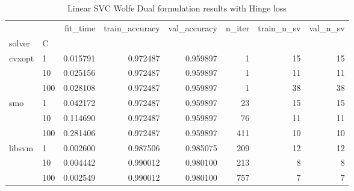 \begin{table}[h!]
\centering
\caption{Linear SVC Wolfe Dual formulation results with Hinge loss}
\label{linear_dual_svc_cv_results}
\begin{tabular}{llrrrrrr}
\toprule
       &     &  fit\_time &  train\_accuracy &  val\_accuracy &  n\_iter &  train\_n\_sv &  val\_n\_sv \\
solver & C &           &                 &               &         &             &           \\
\midrule
cvxopt & 1   &  0.015791 &        0.972487 &      0.959897 &       1 &          15 &        15 \\
       & 10  &  0.025156 &        0.972487 &      0.959897 &       1 &          11 &        11 \\
       & 100 &  0.028108 &        0.972487 &      0.959897 &       1 &          38 &        38 \\
smo & 1   &  0.042172 &        0.972487 &      0.959897 &      23 &          15 &        15 \\
       & 10  &  0.114690 &        0.972487 &      0.959897 &      76 &          11 &        11 \\
       & 100 &  0.281406 &        0.972487 &      0.959897 &     411 &          10 &        10 \\
libsvm & 1   &  0.002600 &        0.987506 &      0.985075 &     209 &          12 &        12 \\
       & 10  &  0.004442 &        0.990012 &      0.980100 &     213 &           8 &         8 \\
       & 100 &  0.002549 &        0.990012 &      0.980100 &     757 &           7 &         7 \\
\bottomrule
\end{tabular}
\end{table}

